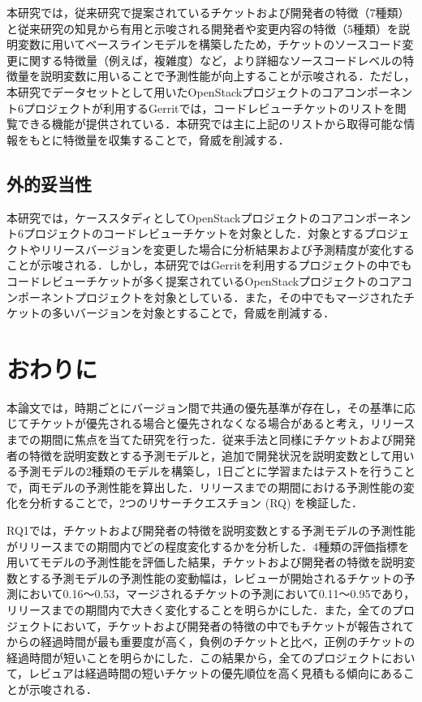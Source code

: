 \documentclass[submit]{ipsj}
\begin{document}
本研究では，従来研究\cite{prioritizer}で提案されているチケットおよび開発者の特徴（7種類）と従来研究\cite{release_merge}\cite{review1}の知見から有用と示唆される開発者や変更内容の特徴（5種類）を説明変数に用いてベースラインモデルを構築したため，チケットのソースコード変更に関する特徴量（例えば，複雑度）など，より詳細なソースコードレベルの特徴量を説明変数に用いることで予測性能が向上することが示唆される．ただし，本研究でデータセットとして用いたOpenStackプロジェクトのコアコンポーネント6プロジェクトが利用するGerritでは，コードレビューチケットのリストを閲覧できる機能が提供されている．本研究では主に上記のリストから取得可能な情報をもとに特徴量を収集することで，脅威を削減する．

\section{外的妥当性}
本研究では，ケーススタディとしてOpenStackプロジェクトのコアコンポーネント6プロジェクトのコードレビューチケットを対象とした．対象とするプロジェクトやリリースバージョンを変更した場合に分析結果および予測精度が変化することが示唆される．しかし，本研究ではGerritを利用するプロジェクトの中でもコードレビューチケットが多く提案されているOpenStackプロジェクトのコアコンポーネントプロジェクトを対象としている．また，その中でもマージされたチケットの多いバージョンを対象とすることで，脅威を削減する．


\chapter{おわりに}\label{sec:fig-tab-exp}
本論文では，時期ごとにバージョン間で共通の優先基準が存在し，その基準に応じてチケットが優先される場合と優先されなくなる場合があると考え，リリースまでの期間に焦点を当てた研究を行った．従来手法と同様にチケットおよび開発者の特徴を説明変数とする予測モデルと，追加で開発状況を説明変数として用いる予測モデルの2種類のモデルを構築し，1日ごとに学習またはテストを行うことで，両モデルの予測性能を算出した．リリースまでの期間における予測性能の変化を分析することで，2つのリサーチクエスチョン (RQ) を検証した．

RQ1では，チケットおよび開発者の特徴を説明変数とする予測モデルの予測性能がリリースまでの期間内でどの程度変化するかを分析した．4種類の評価指標を用いてモデルの予測性能を評価した結果，チケットおよび開発者の特徴を説明変数とする予測モデルの予測性能の変動幅は，レビューが開始されるチケットの予測において0.16〜0.53，マージされるチケットの予測において0.11〜0.95であり，リリースまでの期間内で大きく変化することを明らかにした．また，全てのプロジェクトにおいて，チケットおよび開発者の特徴の中でもチケットが報告されてからの経過時間が最も重要度が高く，負例のチケットと比べ，正例のチケットの経過時間が短いことを明らかにした．この結果から，全てのプロジェクトにおいて，レビュアは経過時間の短いチケットの優先順位を高く見積もる傾向にあることが示唆される．
\end{document}

